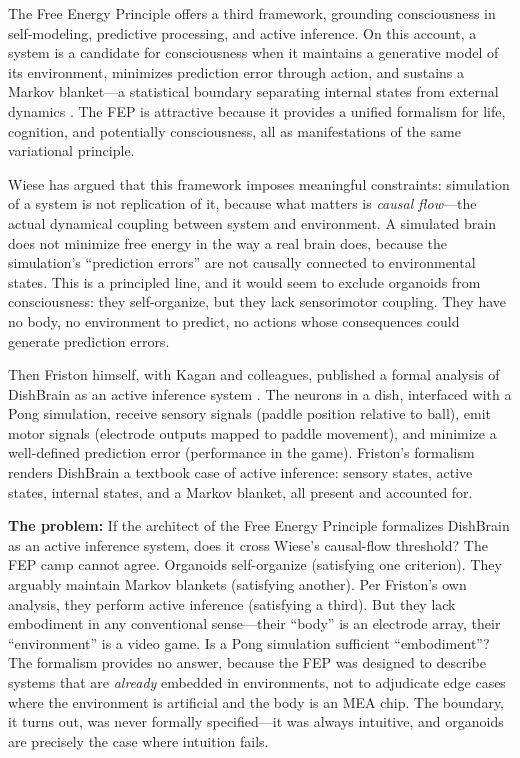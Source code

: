 The Free Energy Principle offers a third framework, grounding consciousness in self-modeling, predictive processing, and active inference. On this account, a system is a candidate for consciousness when it maintains a generative model of its environment, minimizes prediction error through action, and sustains a Markov blanket---a statistical boundary separating internal states from external dynamics \cite{friston2010free}. The FEP is attractive because it provides a unified formalism for life, cognition, and potentially consciousness, all as manifestations of the same variational principle.

Wiese \cite{wiese2024fep} has argued that this framework imposes meaningful constraints: simulation of a system is not replication of it, because what matters is \textit{causal flow}---the actual dynamical coupling between system and environment. A simulated brain does not minimize free energy in the way a real brain does, because the simulation's ``prediction errors'' are not causally connected to environmental states. This is a principled line, and it would seem to exclude organoids from consciousness: they self-organize, but they lack sensorimotor coupling. They have no body, no environment to predict, no actions whose consequences could generate prediction errors.

Then Friston himself, with Kagan and colleagues, published a formal analysis of DishBrain as an active inference system \cite{friston2025active}. The neurons in a dish, interfaced with a Pong simulation, receive sensory signals (paddle position relative to ball), emit motor signals (electrode outputs mapped to paddle movement), and minimize a well-defined prediction error (performance in the game). Friston's formalism renders DishBrain a textbook case of active inference: sensory states, active states, internal states, and a Markov blanket, all present and accounted for.

\textbf{The problem:} If the architect of the Free Energy Principle formalizes DishBrain as an active inference system, does it cross Wiese's causal-flow threshold? The FEP camp cannot agree. Organoids self-organize (satisfying one criterion). They arguably maintain Markov blankets (satisfying another). Per Friston's own analysis, they perform active inference (satisfying a third). But they lack embodiment in any conventional sense---their ``body'' is an electrode array, their ``environment'' is a video game. Is a Pong simulation sufficient ``embodiment''? The formalism provides no answer, because the FEP was designed to describe systems that are \textit{already} embedded in environments, not to adjudicate edge cases where the environment is artificial and the body is an MEA chip. The boundary, it turns out, was never formally specified---it was always intuitive, and organoids are precisely the case where intuition fails.

